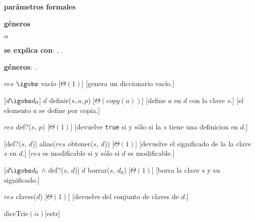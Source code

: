 
\begin{Interfaz}

  \textbf{par\'ametros formales}\parindent\\
  \parbox{1.7cm}{\textbf{g\'eneros}} $\alpha$
 
 
  \textbf{se explica con}: , .

  \textbf{g\'eneros}: .

  {$res$ $\igobs$ vac\'io}
  [$\Theta(1)$]
  [genera un diccionario vac\'io.]

  [$d \igobs d_0$]
  {$d$ \igobs definir($s, a, p$)}
  [$\Theta(copy(a))$]
  [define $a$ en $d$ con la clave $s$.]
  [el elemento $a$ se define por copia.]

  {$res$ \igobs def?($s$, $p$)}
  [$\Theta(1)$]
  [devuelve \texttt{true} si y s\'olo si la $s$ tiene una definicion en $d$.]

  [def?($s$, $d$)]
  {alias($res$ \igobs obtener($s$, $d$))}
  [$\Theta(1)$]
  [devuelve el significado de la la clave $s$ en $d$.]
  [$res$ es modificable si y s\'olo si $d$ es modificable.]

  [$d \igobs d_0$ $\land$ def?($s$, $d$)]
  {$d$ \igobs borrar($s$, $d_0$)}
  [$\Theta(1)$]
  [borra la clave $s$ y su significado.]

  {$res$ \igobs claves($d$)}
  [$\Theta(1)$]
  [devuelve del conjunto de claves de $d$.]


\end{Interfaz}

\begin{Representacion}
  
  \begin{Estructura}{diccTrie$(\alpha)$}[estr]
    \begin{Tupla}[estr]
    \end{Tupla}

    \begin{Tupla}[nodo]
    \end{Tupla}
  \end{Estructura}




  ~

  \AbsFc[]{}

\end{Representacion}


